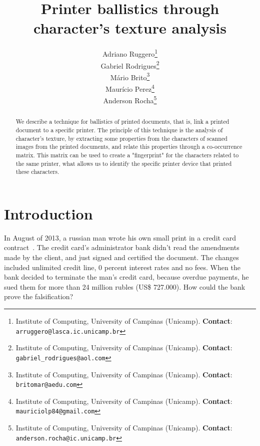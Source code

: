 \documentclass[10pt,twocolumn,letterpaper]{article}
\begin{document}
\title{Printer ballistics through character's texture analysis}
\author{Adriano Ruggero\thanks{Institute of Computing, University of Campinas (Unicamp). \textbf{Contact}: \tt\small{arruggero@lasca.ic.unicamp.br}}\\
Gabriel Rodrigues\thanks{Institute of Computing, University of Campinas (Unicamp). \textbf{Contact}: \tt\small{gabriel\_rodrigues@aol.com}}\\
Mário Brito\thanks{Institute of Computing, University of Campinas (Unicamp). \textbf{Contact}:
\tt\small{britomar@aedu.com}}\\
Maurício Perez\thanks{Institute of Computing, University of Campinas (Unicamp). \textbf{Contact}:
\tt\small{mauriciolp84@gmail.com}}\\
Anderson Rocha\thanks{Institute of Computing, University of Campinas (Unicamp). \textbf{Contact}: \tt\small{anderson.rocha@ic.unicamp.br}}
}

\maketitle
\begin{abstract}
We describe a technique for ballistics of printed documents, that is, link a printed document to a specific printer. The principle of this technique is the analysis of character's texture, by extracting some properties from the characters of scanned images from the printed documents, and relate this properties through a co-occurrence matrix. This matrix can be used to create a "fingerprint" for the characters related to the same printer, what allows us to identify the specific printer device that printed these characters.
\end{abstract}

\section{Introduction}
\label{sec:introduction}

In August of 2013, a russian man wrote his own small print in a credit card contract~\cite{RT}. The credit card's administrator bank didn't read the amendments made by the client, and just signed and certified the document. The changes included unlimited credit line, 0 percent interest rates and no fees. When the bank decided to terminate the man's credit card, because overdue payments, he sued them for more than 24 million rubles (US\$ 727.000). How could the bank prove the falsification?
\end{document}
